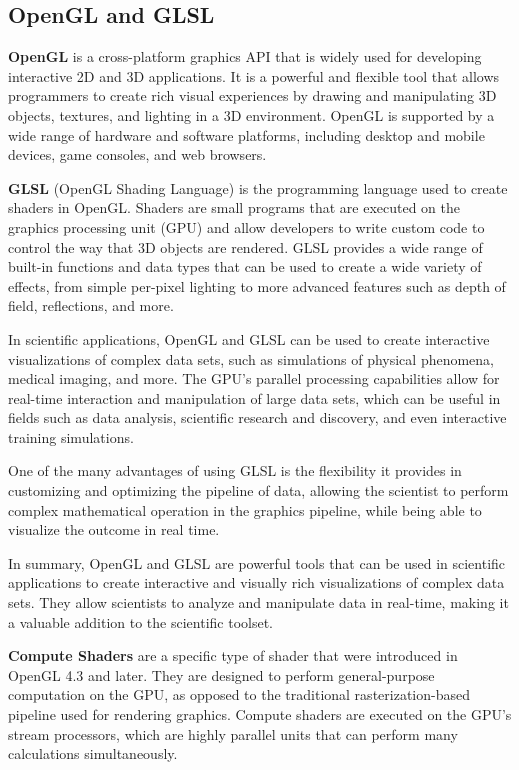 \subsection{\Large OpenGL and GLSL}
    \textbf{OpenGL}\cite{Sellers}\cite{Vries} is a cross-platform graphics API that is widely used for developing interactive 2D and 3D applications. It is a powerful and flexible tool that allows programmers to create rich visual experiences by drawing and manipulating 3D objects, textures, and lighting in a 3D environment. OpenGL is supported by a wide range of hardware and software platforms, including desktop and mobile devices, game consoles, and web browsers.

    \textbf{GLSL} (OpenGL Shading Language) is the programming language used to create shaders in OpenGL. Shaders are small programs that are executed on the graphics processing unit (GPU) and allow developers to write custom code to control the way that 3D objects are rendered. GLSL provides a wide range of built-in functions and data types that can be used to create a wide variety of effects, from simple per-pixel lighting to more advanced features such as depth of field, reflections, and more.
    
    In scientific applications, OpenGL and GLSL can be used to create interactive visualizations of complex data sets, such as simulations of physical phenomena, medical imaging, and more. The GPU's parallel processing capabilities allow for real-time interaction and manipulation of large data sets, which can be useful in fields such as data analysis, scientific research and discovery, and even interactive training simulations.
    
    One of the many advantages of using GLSL is the flexibility it provides in customizing and optimizing the pipeline of data, allowing the scientist to perform complex mathematical operation in the graphics pipeline, while being able to visualize the outcome in real time.
    
    In summary, OpenGL and GLSL are powerful tools that can be used in scientific applications to create interactive and visually rich visualizations of complex data sets. They allow scientists to analyze and manipulate data in real-time, making it a valuable addition to the scientific toolset.

    \textbf{Compute Shaders} are a specific type of shader that were introduced in OpenGL 4.3 and later. They are designed to perform general-purpose computation on the GPU, as opposed to the traditional rasterization-based pipeline used for rendering graphics. Compute shaders are executed on the GPU's stream processors, which are highly parallel units that can perform many calculations simultaneously.

